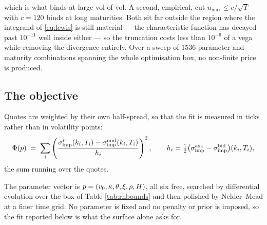 \vspace{-0.42cm}

which is what binds at large vol-of-vol. A second, empirical, cut $u_{\max}\le c/\sqrt{T}$ with
$c=120$ binds at long maturities. Both sit far outside the region where the integrand of
\eqref{eq:lewis} is still material --- the characteristic function has decayed past $10^{-11}$ well
inside either --- so the truncation costs less than $10^{-6}$ of a vega while removing the divergence
entirely. Over a sweep of $1536$ parameter and maturity combinations spanning the whole optimisation
box, no non-finite price is produced.

\subsection{The objective}
\label{subsec:rhobjective}

Quotes are weighted by their own half-spread, so that the fit is measured in ticks rather than in
volatility points:
\begin{equation}\label{eq:rhobjective}
  \Phi(p)\;=\;\sum_{i}\left(\frac{\sigma_{\mathrm{imp}}^{p}(k_{i},T_{i})-\sigma_{\mathrm{imp}}^{\mathrm{mid}}(k_{i},T_{i})}
  {h_{i}}\right)^{2},
  \qquad h_{i}=\tfrac12\bigl(\sigma_{\mathrm{imp}}^{\mathrm{ask}}-\sigma_{\mathrm{imp}}^{\mathrm{bid}}\bigr)(k_{i},T_{i}),
\end{equation}
the sum running over the quotes.

The parameter vector is $p=(v_{0},\kappa,\theta,\xi,\rho,H)$, all six free, searched by
differential evolution over the box of Table \ref{tab:rhbounds} and then polished by Nelder--Mead at a
finer time grid. No parameter is fixed and no penalty or prior is imposed, so the fit reported below
is what the surface alone asks for.



